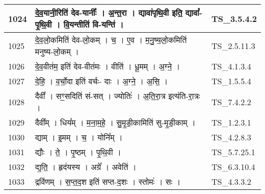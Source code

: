 \documentclass[17pt]{extarticle}
\begin{document}
\begin{longtable}{||p{0.4in}||p{4.9in}||p{0.9in}||}
    \hline
        
    1024 & दे॒व॒यानी॒रिति॑ देव{-}यानीः᳚   ।   अ॒न्त॒रा   ।   द्यावा॑पृथि॒वी इति॒ द्यावा᳚{-}पृ॒थि॒वी   ।   वि॒यन्तीति॑ वि{-}यन्ति॑   ।    & TS\_3.5.4.2       \\
    
    \hline
        
    1025 & दे॒व॒लो॒कमिति॑ देव{-}लो॒कम्   ।   च॒   ।   ए॒व   ।   म॒नु॒ष्य॒लो॒कमिति॑ मनुष्य{-}लो॒कम्   ।    & TS\_2.5.11.3       \\
    
    \hline
        
    1026 & दे॒व॒वीत॑म॒ इति॑ देव{-}वीत॑मः   ।   वीति॑   ।   धू॒मम्   ।   अ॒ग्ने॒   ।    & TS\_4.1.3.4       \\
    
    \hline
        
    1027 & दे॒हि॒   ।   व॒र्चो॒दा इति॑ वर्चः{-} दाः   ।   अ॒ग्ने॒   ।   अ॒सि॒   ।    & TS\_1.5.5.4       \\
    
    \hline
        
    1028 & दैवी᳚   ।   सꣳ॒॒सदिति॑ सं{-}सत्   ।   ज्योतिः॑   ।   अ॒ति॒रा॒त्र इत्य॑ति{-}रा॒त्रः   ।    & TS\_7.4.2.2       \\
    
    \hline
        
    1029 & दैवी᳚म्   ।   धिय᳚म्   ।   म॒ना॒म॒हे॒   ।   सु॒मृ॒डी॒कामिति॑ सु{-}मृ॒डी॒काम्   ।    & TS\_1.2.3.1       \\
    
    \hline
        
    1030 & द्याम्   ।   इ॒मम्   ।   च॒   ।   योनि᳚म्   ।    & TS\_4.2.8.3       \\
    
    \hline
        
    1031 & द्यौः   ।   ते॒   ।   पृ॒ष्ठम्   ।   पृ॒थि॒वी   ।    & TS\_5.7.25.1       \\
    
    \hline
        
    1032 & द्य॒ति॒   ।   हृद॑यस्य   ।   अग्रे᳚   ।   अवेति॑   ।    & TS\_6.3.10.4       \\
    
    \hline
        
    1033 & द्रवि॑णम्   ।   स॒प्त॒द॒श इति॑ सप्त{-}द॒शः   ।   स्तोमः॑   ।   सः   ।    & TS\_4.3.3.2       \\
    
    \hline
        

\end{longtable}
\end{document}
